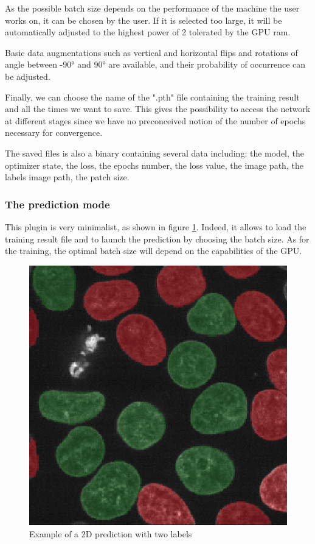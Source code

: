\documentclass{article}
\begin{document}
As the possible batch size depends on the performance of the machine the user works on, it can be chosen by the user. If it is selected too large, it will be automatically adjusted to the highest power of 2 tolerated by the GPU ram.

Basic data augmentations such as vertical and horizontal flips and rotations of angle between -90° and 90° are available, and their probability of occurrence can be adjusted. 

Finally, we can choose the name of the ".pth" file containing the training result and all the times we want to save. This gives the possibility to access the network at different stages since we have no preconceived notion of the number of epochs necessary for convergence.

The saved files is also a binary containing several data including: the model, the optimizer state, the loss, the epochs number, the loss value, the image path, the labels image path, the patch size.

\subsubsection{The prediction mode}

This plugin is very minimalist, as shown in figure \ref{predict}. Indeed, it allows to load the training result file and to launch the prediction by choosing the batch size. As for the training, the optimal batch size will depend on the capabilities of the GPU.

\begin{figure}[htp!]{}
 \centering
 \includegraphics[scale=0.15]{Figures/resultat.png}
  \caption{Example of a 2D prediction with two labels}
  \label{predict}

\end{figure}
\end{document}
